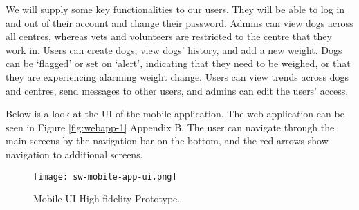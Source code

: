 We will supply some key functionalities to our users. They will be able to log in and out of their account and change their password. Admins can view dogs across all centres, whereas vets and volunteers are restricted to the centre that they work in. Users can create dogs, view dogs’ history, and add a new weight. Dogs can be ‘flagged’ or set on ‘alert’, indicating that they need to be weighed, or that they are experiencing alarming weight change. Users can view trends across dogs and centres, send messages to other users, and admins can edit the users’ access. 

Below is a look at the UI of the mobile application. The web application can be seen in Figure \ref{fig:webapp-1} Appendix B. The user can navigate through the main screens by the navigation bar on the bottom, and the red arrows show navigation to additional screens.

\begin{figure}[!ht]
	\centering
	\texttt{[image: sw-mobile-app-ui.png]}
	\caption{Mobile UI High-fidelity Prototype.}
	\label{fig:mobileapp-1}
\end{figure}

 

